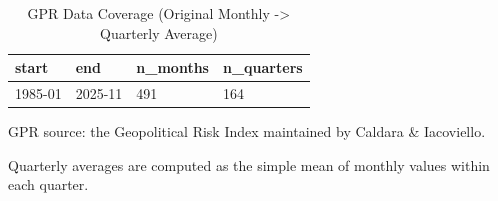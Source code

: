 \begin{table}[!htbp]
    \centering
    \small
    \caption{GPR Data Coverage (Original Monthly -> Quarterly Average)}
    \label{tab:gpr_coverage}
    \begin{threeparttable}
        \begin{tabular}{@{}llll@{}}
            \toprule
            start   & end     & n_months & n_quarters \\
            \midrule
            1985-01 & 2025-11 & 491      & 164        \\
            \bottomrule
        \end{tabular}
        \begin{tablenotes}[flushleft]
            \footnotesize
            \item GPR source: the Geopolitical Risk Index maintained by Caldara \& Iacoviello.
            \item Quarterly averages are computed as the simple mean of monthly values within each quarter.
        \end{tablenotes}
    \end{threeparttable}
\end{table}
